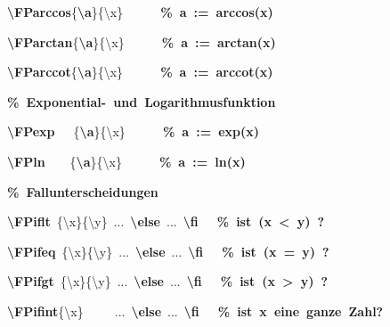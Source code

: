 {{\rule[-0.5ex]{0pt}{2.5ex}\hspace*{0.0em}\textcolor{R}{\textbf{\textbackslash{}FParccos}}\{\textcolor{B}{\textbf{\textbackslash{}a}}\}\{\textbackslash{}x\}~~~~~~\textcolor{G}{\textbf{\%~a~:=~arccos(x)}}\\
\rule[-0.5ex]{0pt}{2.5ex}\hspace*{0.0em}\textcolor{R}{\textbf{\textbackslash{}FParctan}}\{\textcolor{B}{\textbf{\textbackslash{}a}}\}\{\textbackslash{}x\}~~~~~~\textcolor{G}{\textbf{\%~a~:=~arctan(x)}}\\
\rule[-0.5ex]{0pt}{2.5ex}\hspace*{0.0em}\textcolor{R}{\textbf{\textbackslash{}FParccot}}\{\textcolor{B}{\textbf{\textbackslash{}a}}\}\{\textbackslash{}x\}~~~~~~\textcolor{G}{\textbf{\%~a~:=~arccot(x)}}\\
\rule[-0.5ex]{0pt}{2.5ex}\hspace*{0.0em}\textcolor{G}{\textbf{\%~Exponential{-}~und~Logarithmusfunktion}}\\
\rule[-0.5ex]{0pt}{2.5ex}\hspace*{0.0em}\textcolor{R}{\textbf{\textbackslash{}FPexp}}~~~\{\textcolor{B}{\textbf{\textbackslash{}a}}\}\{\textbackslash{}x\}~~~~~~\textcolor{G}{\textbf{\%~a~:=~exp(x)}}\\
\rule[-0.5ex]{0pt}{2.5ex}\hspace*{0.0em}\textcolor{R}{\textbf{\textbackslash{}FPln}}~~~~\{\textcolor{B}{\textbf{\textbackslash{}a}}\}\{\textbackslash{}x\}~~~~~~\textcolor{G}{\textbf{\%~a~:=~ln(x)}}\\
\rule[-0.5ex]{0pt}{2.5ex}\hspace*{0.0em}\textcolor{G}{\textbf{\%~Fallunterscheidungen}}\\
\rule[-0.5ex]{0pt}{2.5ex}\hspace*{0.0em}\textcolor{R}{\textbf{\textbackslash{}FPiflt}}~\{\textbackslash{}x\}\{\textbackslash{}y\}~...~\textcolor{R}{\textbf{\textbackslash{}else}}~...~\textcolor{R}{\textbf{\textbackslash{}fi}}~~~\textcolor{G}{\textbf{\%~ist~(x~{<}~y)~?}}\\
\rule[-0.5ex]{0pt}{2.5ex}\hspace*{0.0em}\textcolor{R}{\textbf{\textbackslash{}FPifeq}}~\{\textbackslash{}x\}\{\textbackslash{}y\}~...~\textcolor{R}{\textbf{\textbackslash{}else}}~...~\textcolor{R}{\textbf{\textbackslash{}fi}}~~~\textcolor{G}{\textbf{\%~ist~(x~=~y)~?}}\\
\rule[-0.5ex]{0pt}{2.5ex}\hspace*{0.0em}\textcolor{R}{\textbf{\textbackslash{}FPifgt}}~\{\textbackslash{}x\}\{\textbackslash{}y\}~...~\textcolor{R}{\textbf{\textbackslash{}else}}~...~\textcolor{R}{\textbf{\textbackslash{}fi}}~~~\textcolor{G}{\textbf{\%~ist~(x~{>}~y)~?}}\\
\rule[-0.5ex]{0pt}{2.5ex}\hspace*{0.0em}\textcolor{R}{\textbf{\textbackslash{}FPifint}}\{\textbackslash{}x\}~~~~~...~\textcolor{R}{\textbf{\textbackslash{}else}}~...~\textcolor{R}{\textbf{\textbackslash{}fi}}~~~\textcolor{G}{\textbf{\%~ist~x~eine~ganze~Zahl?}}}%
}%
\endgroup
